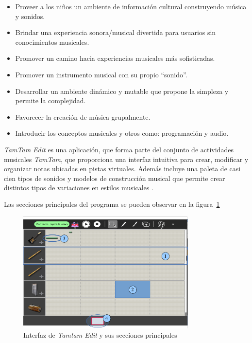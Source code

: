 \begin{itemize}
    \item Proveer a los ni\~nos un ambiente de informaci\'on cultural construyendo m\'usica y sonidos.
    \item Brindar una experiencia sonora/musical divertida para usuarios sin conocimientos musicales.
    \item Promover un camino hacia experiencias musicales m\'as sofisticadas.
    \item Promover un instrumento musical con su propio ``sonido''.
    \item Desarrollar un ambiente din\'amico y mutable que propone la simpleza y permite la complejidad.
    \item Favorecer la creaci\'on de m\'usica grupalmente.
    \item Introducir los conceptos musicales y otros como: programaci\'on y audio.
\end{itemize}

\emph{TamTam Edit} es una aplicaci\'on, que forma parte del conjunto de actividades musicales 
\emph{TamTam}, que proporciona una interfaz intuitiva para crear, modificar y organizar notas ubicadas 
en pistas virtuales.
Adem\'as incluye una paleta de casi cien tipos de sonidos y modelos de construcci\'on musical que permite 
crear distintos tipos de variaciones en estilos musicales \cite{TamTamWiki}.


Las secciones principales del programa se pueden observar en la figura~\ref{figure:ui-tamtam} 

\begin{figure}[H]
\centering
\includegraphics[width=0.8\textwidth]{./graphics/ui-tamtam-edit.png}
\caption{Interfaz de \emph{Tamtam Edit} y sus secciones principales}
\label{figure:ui-tamtam}
\end{figure}

